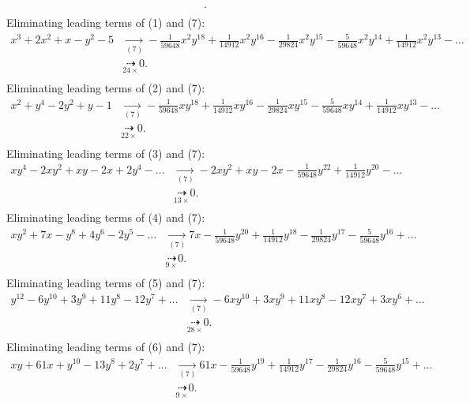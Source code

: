 {\begin{align*}
.\\ \end{align*}
Eliminating leading terms of (1) and (7):
\begin{align*}
x^{3}+2x^{2}+x-y^{2}-5&\underset{(7)}{\rightarrow}-\frac{1}{59648}x^{2}y^{18}+\frac{1}{14912}x^{2}y^{16}-\frac{1}{29824}x^{2}y^{15}-\frac{5}{59648}x^{2}y^{14}+\frac{1}{14912}x^{2}y^{13}-\ldots
\\ &\underset{24\times}{\dashrightarrow}0
.\\ \end{align*}
Eliminating leading terms of (2) and (7):
\begin{align*}
x^{2}+y^{4}-2y^{2}+y-1&\underset{(7)}{\rightarrow}-\frac{1}{59648}xy^{18}+\frac{1}{14912}xy^{16}-\frac{1}{29824}xy^{15}-\frac{5}{59648}xy^{14}+\frac{1}{14912}xy^{13}-\ldots
\\ &\underset{22\times}{\dashrightarrow}0
.\\ \end{align*}
Eliminating leading terms of (3) and (7):
\begin{align*}
xy^{4}-2xy^{2}+xy-2x+2y^{4}-\ldots&\underset{(7)}{\rightarrow}-2xy^{2}+xy-2x-\frac{1}{59648}y^{22}+\frac{1}{14912}y^{20}-\ldots
\\ &\underset{13\times}{\dashrightarrow}0
.\\ \end{align*}
Eliminating leading terms of (4) and (7):
\begin{align*}
xy^{2}+7x-y^{8}+4y^{6}-2y^{5}-\ldots&\underset{(7)}{\rightarrow}7x-\frac{1}{59648}y^{20}+\frac{1}{14912}y^{18}-\frac{1}{29824}y^{17}-\frac{5}{59648}y^{16}+\ldots
\\ &\underset{9\times}{\dashrightarrow}0
.\\ \end{align*}
Eliminating leading terms of (5) and (7):
\begin{align*}
y^{12}-6y^{10}+3y^{9}+11y^{8}-12y^{7}+\ldots&\underset{(7)}{\rightarrow}-6xy^{10}+3xy^{9}+11xy^{8}-12xy^{7}+3xy^{6}+\ldots
\\ &\underset{28\times}{\dashrightarrow}0
.\\ \end{align*}
Eliminating leading terms of (6) and (7):
\begin{align*}
xy+61x+y^{10}-13y^{8}+2y^{7}+\ldots&\underset{(7)}{\rightarrow}61x-\frac{1}{59648}y^{19}+\frac{1}{14912}y^{17}-\frac{1}{29824}y^{16}-\frac{5}{59648}y^{15}+\ldots
\\ &\underset{9\times}{\dashrightarrow}0
.\\ \end{align*}
}